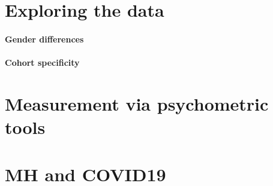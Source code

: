 \section{Exploring the data}


\paragraph{Gender differences}
\paragraph{Cohort specificity}

\section{Measurement via psychometric tools}






\section{MH and COVID19}
